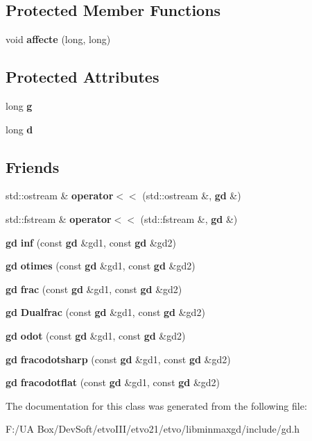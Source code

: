 \subsection*{Protected Member Functions}
\begin{DoxyCompactItemize}
\item 
\mbox{\label{classmmgd_1_1gd_a9f0cbddb58f4e9e1c89d03263589af88}} 
void {\bfseries affecte} (long, long)
\end{DoxyCompactItemize}
\subsection*{Protected Attributes}
\begin{DoxyCompactItemize}
\item 
\mbox{\label{classmmgd_1_1gd_a4d509ea069575b9c3c4719ebfbfdee59}} 
long {\bfseries g}
\item 
\mbox{\label{classmmgd_1_1gd_ab00168800630d031f671ad7057b05aba}} 
long {\bfseries d}
\end{DoxyCompactItemize}
\subsection*{Friends}
\begin{DoxyCompactItemize}
\item 
\mbox{\label{classmmgd_1_1gd_ae6debbf0c1df1dfa98cc657c12c878c1}} 
std\+::ostream \& {\bfseries operator$<$$<$} (std\+::ostream \&, \textbf{ gd} \&)
\item 
\mbox{\label{classmmgd_1_1gd_a2652ce1c0563883317a07fd500b1c6ff}} 
std\+::fstream \& {\bfseries operator$<$$<$} (std\+::fstream \&, \textbf{ gd} \&)
\item 
\mbox{\label{classmmgd_1_1gd_a359420ee0032329d8d8273b9fc01d0b7}} 
\textbf{ gd} {\bfseries inf} (const \textbf{ gd} \&gd1, const \textbf{ gd} \&gd2)
\item 
\mbox{\label{classmmgd_1_1gd_a673acceac37b151854972a1851d1e546}} 
\textbf{ gd} {\bfseries otimes} (const \textbf{ gd} \&gd1, const \textbf{ gd} \&gd2)
\item 
\mbox{\label{classmmgd_1_1gd_a3f4a2aa21f57e46b13660bd83cffa8c4}} 
\textbf{ gd} {\bfseries frac} (const \textbf{ gd} \&gd1, const \textbf{ gd} \&gd2)
\item 
\mbox{\label{classmmgd_1_1gd_a2dd6930af5ca5df0fcb2b684b415c72c}} 
\textbf{ gd} {\bfseries Dualfrac} (const \textbf{ gd} \&gd1, const \textbf{ gd} \&gd2)
\item 
\mbox{\label{classmmgd_1_1gd_a7f189133bc654eb0b9d129cae50b343a}} 
\textbf{ gd} {\bfseries odot} (const \textbf{ gd} \&gd1, const \textbf{ gd} \&gd2)
\item 
\mbox{\label{classmmgd_1_1gd_a4e07c2d7bbd16afdfa616eb51f368b9f}} 
\textbf{ gd} {\bfseries fracodotsharp} (const \textbf{ gd} \&gd1, const \textbf{ gd} \&gd2)
\item 
\mbox{\label{classmmgd_1_1gd_a204321412b18107581b1d547a931d1ff}} 
\textbf{ gd} {\bfseries fracodotflat} (const \textbf{ gd} \&gd1, const \textbf{ gd} \&gd2)
\end{DoxyCompactItemize}


The documentation for this class was generated from the following file\+:\begin{DoxyCompactItemize}
\item 
F\+:/\+U\+A Box/\+Dev\+Soft/etvo\+I\+I\+I/etvo21/etvo/libminmaxgd/include/gd.\+h\end{DoxyCompactItemize}
